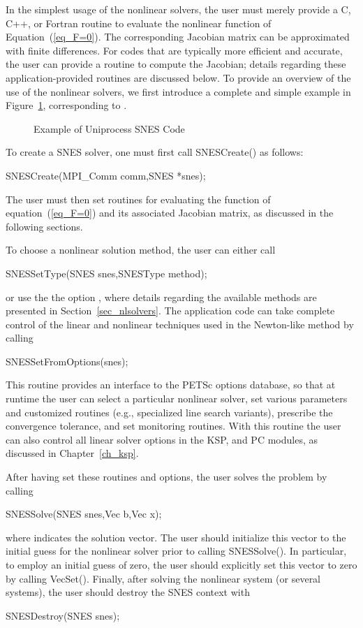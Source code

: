 In the simplest usage of the nonlinear solvers, the user must merely 
provide a C, C++, or Fortran routine to evaluate the nonlinear function 
of Equation~(\ref{eq_F=0}).
The corresponding Jacobian  matrix 
can be approximated with finite differences.
For codes that are typically more efficient and accurate, the
user can provide a routine to compute the Jacobian; details regarding these application-provided 
routines are discussed below.  
To provide an overview of the use of the nonlinear solvers,
we first introduce a complete and simple example in
Figure~\ref{fig_snesexample}, corresponding to 
.  

\begin{figure}[H]
{\small
{}
}
\caption{Example of Uniprocess SNES Code}
\label{fig_snesexample}
\end{figure}

To create a SNES solver, one must first call SNESCreate() as follows:
\begin{tabbing}
  SNESCreate(MPI\_Comm comm,SNES *snes);\\
\end{tabbing}
The user must then set
routines for evaluating the function of equation~(\ref{eq_F=0}) and its
associated Jacobian matrix, as discussed in the following sections.

To choose a nonlinear solution method, the user can either
call
\begin{tabbing}
  SNESSetType(SNES snes,SNESType method);
\end{tabbing}
or use the the option ,  
where details regarding the available methods are presented in
Section~\ref{sec_nlsolvers}.
The application code can take complete control of the linear and
nonlinear techniques used in the Newton-like method by calling
\begin{tabbing}
  SNESSetFromOptions(snes);
\end{tabbing}
This routine provides an interface to the PETSc options database, so
that at runtime the user can select a particular nonlinear solver, set
various parameters and customized routines (e.g., specialized line
search variants), prescribe the convergence tolerance, and set
monitoring routines.  With this routine the user can also control all
linear solver options in the KSP, and PC modules, as discussed
in Chapter~\ref{ch_ksp}.

After having set these routines and options, the user
solves the problem by calling
\begin{tabbing}
  SNESSolve(SNES snes,Vec b,Vec x);
\end{tabbing}
where  indicates the solution vector. The user should
initialize this vector to the initial guess for the nonlinear solver
prior to calling SNESSolve().  In particular, to employ an
initial guess of zero, the user should explicitly set this vector to
zero by calling VecSet().  Finally, after solving the nonlinear
system (or several systems), the user should destroy the SNES context
with
\begin{tabbing}
  SNESDestroy(SNES snes);
\end{tabbing}

